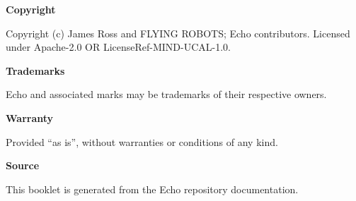 
\thispagestyle{plain}
\vspace*{2cm}

\noindent\textbf{Copyright}\par
\smallskip
Copyright (c) James Ross and FLYING ROBOTS; Echo contributors. Licensed under Apache-2.0 OR LicenseRef-MIND-UCAL-1.0.

\bigskip
\noindent\textbf{Trademarks}\par
Echo and associated marks may be trademarks of their respective owners.

\bigskip
\noindent\textbf{Warranty}\par
Provided “as is”, without warranties or conditions of any kind.

\bigskip
\noindent\textbf{Source}\par
This booklet is generated from the Echo repository documentation.

\clearpage
